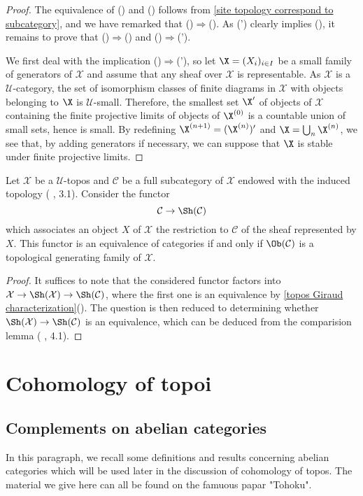 \begin{proof}
The equivalence of () and () follows from \cref{site topology correspond to subcategory}, and we have remarked that ()$\Rightarrow$(). As (') clearly implies (), it remains to prove that ()$\Rightarrow$() and ()$\Rightarrow$(').\par
We first deal with the implication ()$\Rightarrow$('), so let $\X=(X_i)_{i\in I}$ be a small family of generators of $\mathcal{X}$ and assume that any sheaf over $\mathcal{X}$ is representable. As $\mathcal{X}$ is a $\mathscr{U}$-category, the set of isomorphism classes of finite diagrams in $\mathcal{X}$ with objects belonging to $\X$ is $\mathscr{U}$-small. Therefore, the smallest set $\X'$ of objects of $\mathcal{X}$ containing the finite projective limits of objects of $\X^{(0)}$ is a countable union of small sets, hence is small. By redefining $\X^{(n+1)}=(\X^{(n)})'$ and $\X=\bigcup_n\X^{(n)}$, we see that, by adding generators if necessary, we can suppose that $\X$ is stable under finite projective limits.
\end{proof}
\begin{corollary}\label{topos subcategory sheaf cat equivalent iff generating}
Let $\mathcal{X}$ be a $\mathscr{U}$-topos and $\mathcal{C}$ be a full subcategory of $\mathcal{X}$ endowed with the induced topology (\cite{SGA4-1} , 3.1). Consider the functor
\[\mathcal{C}\to \Sh(\mathcal{C})\]
which associates an object $X$ of $\mathcal{X}$ the restriction to $\mathcal{C}$ of the sheaf represented by $X$. This functor is an equivalence of categories if and only if $\Ob(\mathcal{C})$ is a topological generating family of $\mathcal{X}$.
\end{corollary}
\begin{proof}
It suffices to note that the considered functor factors into $\mathcal{X}\to \Sh(\mathcal{X})\to \Sh(\mathcal{C})$, where the first one is an equivalence by \cref{topos Giraud characterization}(). The question is then reduced to determining whether $\Sh(\mathcal{X})\to \Sh(\mathcal{C})$ is an equivalence, which can be deduced from the comparision lemma (\cite{SGA4-1} , 4.1).
\end{proof}
\section{Cohomology of topoi}

\subsection{Complements on abelian categories}
In this paragraph, we recall some definitions and results concerning abelian categories which will be used later in the discussion of cohomology of topos. The material we give here can all be found on the famuous papar "Tohoku".

